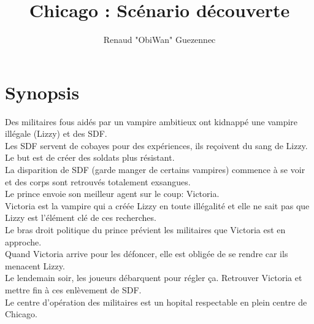 \documentclass[oneside,12pt]{book}
\title{Chicago : Scénario découverte}
\author{Renaud "ObiWan" Guezennec}
\date{}
\begin{document}
\maketitle \clearpage
\tableofcontents \clearpage

\chapter{Synopsis}
Des militaires fous aidés par un vampire ambitieux ont kidnappé une vampire illégale (Lizzy) et des SDF. \\
Les SDF servent de cobayes pour des expériences, ils reçoivent du sang de Lizzy. Le but est de créer des soldats plus résistant.\\
La disparition de SDF (garde manger de certains vampires) commence à se voir et des corps sont retrouvés totalement exsangues.\\
Le prince envoie son meilleur agent sur le coup: Victoria. \\
Victoria est la vampire qui a créée Lizzy en toute illégalité et elle ne sait pas que Lizzy est l'élément clé de ces recherches.\\ 
Le bras droit politique du prince prévient les militaires que Victoria est en approche.\\
Quand Victoria arrive pour les défoncer, elle est obligée de se rendre car ils menacent Lizzy. \\
Le lendemain soir, les joueurs débarquent pour régler ça. Retrouver Victoria et mettre fin à ces enlèvement de SDF.\\
Le centre d'opération des militaires est un hopital respectable en plein centre de Chicago.\\
\end{document}
